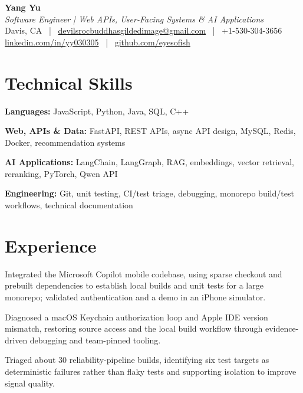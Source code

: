 \documentclass[letterpaper,10pt]{article}
\begin{document}
\begin{center}
  \textbf{\Large Yang Yu} \\
  \textit{Software Engineer | Web APIs, User-Facing Systems \& AI Applications} \\[1pt]
  \small Davis, CA ~|~ \href{mailto:devilsrocbuddhasgildedimage@gmail.com}{devilsrocbuddhasgildedimage@gmail.com} ~|~ +1-530-304-3656 \\
  \small \href{https://linkedin.com/in/yy030305}{linkedin.com/in/yy030305} ~|~ \href{https://github.com/eyesofish}{github.com/eyesofish}
\end{center}

\section{Technical Skills}
\resumeItemListStart
  \item \textbf{Languages:} JavaScript, Python, Java, SQL, C++
  \item \textbf{Web, APIs \& Data:} FastAPI, REST APIs, async API design, MySQL, Redis, Docker, recommendation systems
  \item \textbf{AI Applications:} LangChain, LangGraph, RAG, embeddings, vector retrieval, reranking, PyTorch, Qwen API
  \item \textbf{Engineering:} Git, unit testing, CI/test triage, debugging, monorepo build/test workflows, technical documentation
\resumeItemListEnd

\section{Experience}
\resumeSubHeadingListStart
{}
\resumeItemListStart
  \item Integrated the Microsoft Copilot mobile codebase, using sparse checkout and prebuilt dependencies to establish local builds and unit tests for a large monorepo; validated authentication and a demo in an iPhone simulator.
  \item Diagnosed a macOS Keychain authorization loop and Apple IDE version mismatch, restoring source access and the local build workflow through evidence-driven debugging and team-pinned tooling.
  \item Triaged about 30 reliability-pipeline builds, identifying six test targets as deterministic failures rather than flaky tests and supporting isolation to improve signal quality.
\resumeItemListEnd
\resumeSubHeadingListEnd
\end{document}
